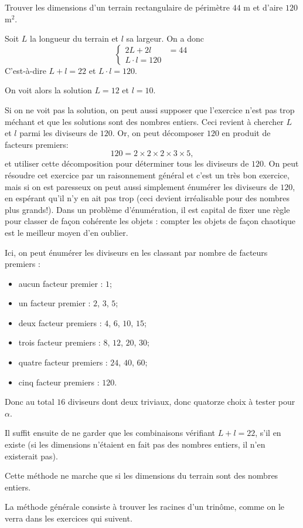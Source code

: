 \begin{exo}
Trouver les dimensions d'un terrain rectangulaire de périmètre $44$ m et d'aire $120$ m${}^2$.
\begin{sol}
Soit $L$ la longueur du terrain et $l$ sa largeur. On a donc 
\[
\begin{cases}
2L+2l &= 44\\
L\cdot l=120
\end{cases}
\]
C'est-à-dire $L+l=22$ et $L\cdot l=120$. 

On \og voit \fg{} alors la solution $L=12$ et $l=10$.

Si on ne voit pas la solution, on peut aussi supposer que l'exercice n'est pas trop méchant et que les solutions sont des nombres entiers. Ceci revient à chercher $L$ et $l$ parmi les diviseurs de $120$. Or, on peut décomposer $120$ en produit de facteurs premiers:
\[ 120 = 2\times 2\times 2 \times 3 \times 5,\]
et utiliser cette décomposition pour déterminer tous les diviseurs de $120$. On peut résoudre cet exercice par un raisonnement général et c'est un très bon exercice, mais si on est paresseux on peut aussi simplement énumérer les diviseurs de $120$, en espérant qu'il n'y en ait pas trop (ceci devient irréalisable pour des nombres plus grands!). Dans un problème d'énumération, il est capital de fixer une règle pour classer de façon cohérente les objets : compter les objets de façon chaotique est le meilleur moyen d'en oublier.

Ici, on peut énumérer les diviseurs en les classant par nombre de facteurs premiers :
\begin{itemize}
\item aucun facteur premier : $1$;
\item un facteur premier : $2$, $3$, $5$;
\item deux facteur premiers : $4$, $6$, $10$, $15$;
\item trois facteur premiers : $8$, $12$, $20$, $30$;
\item quatre facteur premiers : $24$, $40$, $60$;
\item cinq facteur premiers : $120$. 
\end{itemize}
Donc au total $16$ diviseurs dont deux triviaux, donc quatorze choix à tester pour $\alpha$.

Il suffit ensuite de ne garder que les combinaisons vérifiant $L+l=22$, s'il en existe (si les dimensions n'étaient en fait pas des nombres entiers, il n'en existerait pas). 

Cette méthode ne marche que si les dimensions du terrain sont des nombres entiers.

La méthode générale consiste à trouver les racines d'un trinôme, comme on le verra dans les exercices qui suivent.
\end{sol}
\end{exo}





